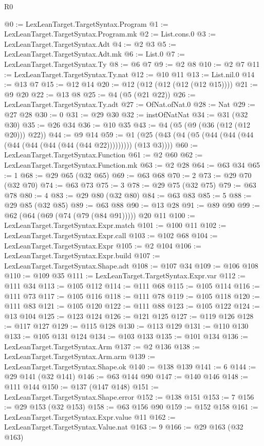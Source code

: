 \begin{lexlean}{R0}
\begin{coremodule}
{{{{{{{{{{{{{{{{{{{{{{{{{{{{{{{{{{{{{{{{{{{{{{{{{{{{{{{{{{{{{{{{{{{{{{{{{{{{{{{{{{{{{{@0 := LexLeanTarget.TargetSyntax.Program
@1 := LexLeanTarget.TargetSyntax.Program.mk
@2 := List.cons.{0}
@3 := LexLeanTarget.TargetSyntax.Adt
@4 := @2 @3
@5 := LexLeanTarget.TargetSyntax.Adt.mk
@6 := List.{0}
@7 := LexLeanTarget.TargetSyntax.Ty
@8 := @6 @7
@9 := @2 @8
@10 := @2 @7
@11 := LexLeanTarget.TargetSyntax.Ty.nat
@12 := @10 @11
@13 := List.nil.{0}
@14 := @13 @7
@15 := @12 @14
@20 := @12 (@12 (@12 (@12 (@12 @15))))
@21 := @9 @20
@22 := @13 @8
@25 := @4 (@5 (@21 @22))
@26 := LexLeanTarget.TargetSyntax.Ty.adt
@27 := OfNat.ofNat.{0}
@28 := Nat
@29 := @27 @28
@30 := 0
@31 := @29 @30
@32 := instOfNatNat
@34 := @31 (@32 @30)
@35 := @26 @34
@36 := @10 @35
@43 := @4 (@5 (@9 (@36 (@12 (@12 @20))) @22))
@44 := @9 @14
@59 := @1 (@25 (@43 (@4 (@5 (@44 (@44 (@44 (@44 (@44 (@44 (@44 (@44 @22))))))))) (@13 @3))))
@60 := LexLeanTarget.TargetSyntax.Function
@61 := @2 @60
@62 := LexLeanTarget.TargetSyntax.Function.mk
@63 := @2 @28
@64 := @63 @34
@65 := 1
@68 := @29 @65 (@32 @65)
@69 := @63 @68
@70 := 2
@73 := @29 @70 (@32 @70)
@74 := @63 @73
@75 := 3
@78 := @29 @75 (@32 @75)
@79 := @63 @78
@80 := 4
@83 := @29 @80 (@32 @80)
@84 := @63 @83
@85 := 5
@88 := @29 @85 (@32 @85)
@89 := @63 @88
@90 := @13 @28
@91 := @89 @90
@99 := @62 (@64 (@69 (@74 (@79 (@84 @91))))) @20 @11
@100 := LexLeanTarget.TargetSyntax.Expr.match
@101 := @100 @11
@102 := LexLeanTarget.TargetSyntax.Expr.call
@103 := @102 @68
@104 := LexLeanTarget.TargetSyntax.Expr
@105 := @2 @104
@106 := LexLeanTarget.TargetSyntax.Expr.build
@107 := LexLeanTarget.TargetSyntax.Shape.adt
@108 := @107 @34
@109 := @106 @108
@110 := @109 @35
@111 := LexLeanTarget.TargetSyntax.Expr.var
@112 := @111 @34
@113 := @105 @112
@114 := @111 @68
@115 := @105 @114
@116 := @111 @73
@117 := @105 @116
@118 := @111 @78
@119 := @105 @118
@120 := @111 @83
@121 := @105 @120
@122 := @111 @88
@123 := @105 @122
@124 := @13 @104
@125 := @123 @124
@126 := @121 @125
@127 := @119 @126
@128 := @117 @127
@129 := @115 @128
@130 := @113 @129
@131 := @110 @130
@133 := @105 @131 @124
@134 := @103 @133
@135 := @101 @134
@136 := LexLeanTarget.TargetSyntax.Arm
@137 := @2 @136
@138 := LexLeanTarget.TargetSyntax.Arm.arm
@139 := LexLeanTarget.TargetSyntax.Shape.ok
@140 := @138 @139
@141 := 6
@144 := @29 @141 (@32 @141)
@146 := @63 @144 @90
@147 := @140 @146
@148 := @111 @144
@150 := @137 (@147 @148)
@151 := LexLeanTarget.TargetSyntax.Shape.error
@152 := @138 @151
@153 := 7
@156 := @29 @153 (@32 @153)
@158 := @63 @156 @90
@159 := @152 @158
@161 := LexLeanTarget.TargetSyntax.Expr.value @11
@162 := LexLeanTarget.TargetSyntax.Value.nat
@163 := 9
@166 := @29 @163 (@32 @163)
}}}}}}}}}}}}}}}}}}}}}}}}}}}}}}}}}}}}}}}}}}}}}}}}}}}}}}}}}}}}}}}}}}}}}}}}}}}}}}}}}}}}}}
\end{coremodule}
\end{lexlean}
